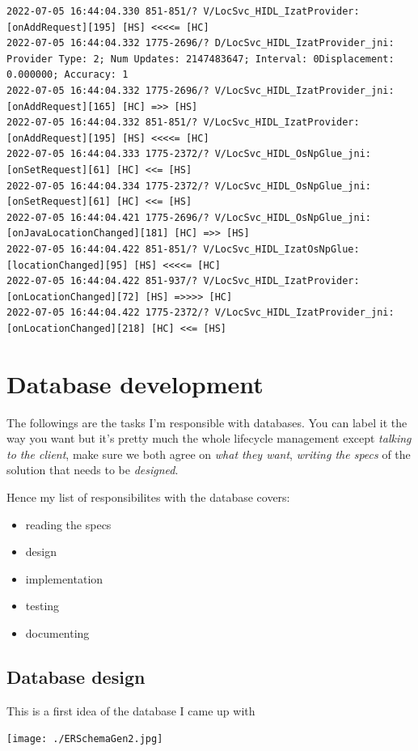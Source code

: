 \documentclass[a4paper,12pt]{book}
\begin{document}
\begin{lstlisting}
2022-07-05 16:44:04.330 851-851/? V/LocSvc_HIDL_IzatProvider: [onAddRequest][195] [HS] <<<<= [HC]
2022-07-05 16:44:04.332 1775-2696/? D/LocSvc_HIDL_IzatProvider_jni: Provider Type: 2; Num Updates: 2147483647; Interval: 0Displacement: 0.000000; Accuracy: 1
2022-07-05 16:44:04.332 1775-2696/? V/LocSvc_HIDL_IzatProvider_jni: [onAddRequest][165] [HC] =>> [HS]
2022-07-05 16:44:04.332 851-851/? V/LocSvc_HIDL_IzatProvider: [onAddRequest][195] [HS] <<<<= [HC]
2022-07-05 16:44:04.333 1775-2372/? V/LocSvc_HIDL_OsNpGlue_jni: [onSetRequest][61] [HC] <<= [HS]
2022-07-05 16:44:04.334 1775-2372/? V/LocSvc_HIDL_OsNpGlue_jni: [onSetRequest][61] [HC] <<= [HS]
2022-07-05 16:44:04.421 1775-2696/? V/LocSvc_HIDL_OsNpGlue_jni: [onJavaLocationChanged][181] [HC] =>> [HS]
2022-07-05 16:44:04.422 851-851/? V/LocSvc_HIDL_IzatOsNpGlue: [locationChanged][95] [HS] <<<<= [HC]
2022-07-05 16:44:04.422 851-937/? V/LocSvc_HIDL_IzatProvider: [onLocationChanged][72] [HS] =>>>> [HC]
2022-07-05 16:44:04.422 1775-2372/? V/LocSvc_HIDL_IzatProvider_jni: [onLocationChanged][218] [HC] <<= [HS]
\end{lstlisting}
\part{Database development}

The followings are the tasks I'm responsible with databases. You can label it the way you want but it's pretty much the whole lifecycle management except \emph{talking to the client}, make sure we both agree on \emph{what they want}, \emph{writing the specs} of the solution that needs to be \emph{designed}.

Hence my list of responsibilites with the database covers:

\begin{itemize}
\item {reading the specs}
\item design
\item implementation
\item testing 
\item documenting
\end{itemize}

\clearpage

\chapter{Database design}
This is a first idea of the database I came up with

\noindent\texttt{[image: ./ERSchemaGen2.jpg]}
\end{document}
